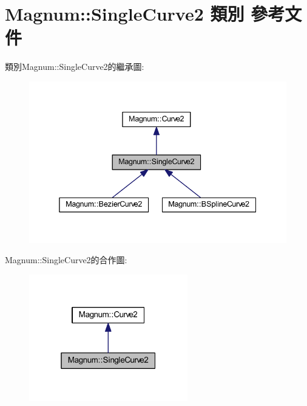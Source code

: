 \hypertarget{class_magnum_1_1_single_curve2}{}\section{Magnum\+:\+:Single\+Curve2 類別 參考文件}
\label{class_magnum_1_1_single_curve2}


類別\+Magnum\+:\+:Single\+Curve2的繼承圖\+:\nopagebreak
\begin{figure}[H]
\begin{center}
\leavevmode
\includegraphics[width=338pt]{class_magnum_1_1_single_curve2__inherit__graph}
\end{center}
\end{figure}


Magnum\+:\+:Single\+Curve2的合作圖\+:\nopagebreak
\begin{figure}[H]
\begin{center}
\leavevmode
\includegraphics[width=196pt]{class_magnum_1_1_single_curve2__coll__graph}
\end{center}
\end{figure}
